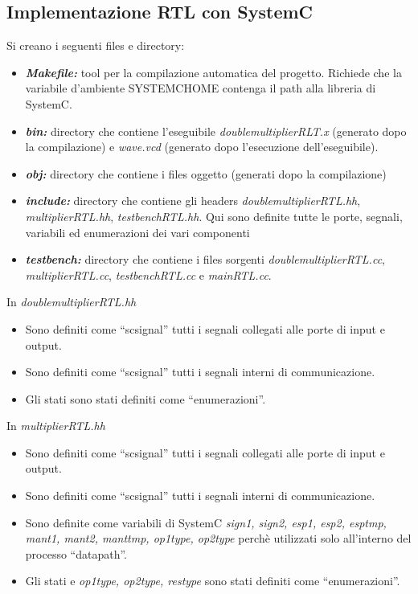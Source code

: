 \documentclass[]{IEEEtran}
\begin{document}
\subsection{Implementazione RTL con SystemC}
Si creano i seguenti files e directory:
\begin{itemize}
\item {\it\bf Makefile:} tool per la compilazione automatica del progetto. Richiede che la variabile d'ambiente SYSTEMC\textunderscore HOME contenga il path alla libreria di SystemC.
\item {\it\bf bin:} directory che contiene l'eseguibile {\it double\textunderscore multiplier\textunderscore RLT.x} (generato dopo la compilazione) e {\it wave.vcd} (generato dopo l'esecuzione dell'eseguibile).
\item {\it\bf obj:} directory che contiene i files oggetto (generati dopo la compilazione)
\item {\it\bf include:} directory che contiene gli headers {\it double\textunderscore multiplier\textunderscore RTL.hh}, {\it multiplier\textunderscore RTL.hh}, {\it testbench\textunderscore RTL.hh}. Qui sono definite tutte le porte, segnali, variabili ed enumerazioni dei vari componenti
\item {\it\bf testbench:} directory che contiene i files sorgenti {\it double\textunderscore multiplier\textunderscore RTL.cc}, {\it multiplier\textunderscore RTL.cc}, {\it testbench\textunderscore RTL.cc} e {\it main\textunderscore RTL.cc}.
\end{itemize}
In {\it double\textunderscore multiplier\textunderscore RTL.hh}
\begin{itemize}
\item Sono definiti come ``sc\textunderscore signal'' tutti i segnali collegati alle porte di input e output.
\item Sono definiti come ``sc\textunderscore signal'' tutti i segnali interni di communicazione.
\item Gli stati sono stati definiti come ``enumerazioni''.
\end{itemize}
In {\it multiplier\textunderscore RTL.hh}
\begin{itemize}
\item Sono definiti come ``sc\textunderscore signal'' tutti i segnali collegati alle porte di input e output.
\item Sono definiti come ``sc\textunderscore signal'' tutti i segnali interni di communicazione.
\item Sono definite come variabili di SystemC {\it sign1, sign2, esp1, esp2, esp\textunderscore tmp, mant1, mant2, mant\textunderscore tmp, op1\textunderscore type, op2\textunderscore type} perchè utilizzati solo all'interno del processo ``datapath''.
\item Gli stati e {\it op1\textunderscore type, op2\textunderscore type, res\textunderscore type} sono stati definiti come ``enumerazioni''.
\end{itemize}
\end{document}
